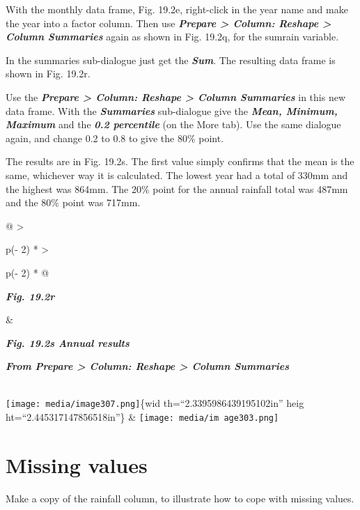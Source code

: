 \documentclass[
  letterpaper,
  DIV=11,
  numbers=noendperiod]{scrreprt}
\begin{document}
With the monthly data frame, Fig. 19.2e, right-click in the year name
and make the year into a factor column. Then use \textbf{\emph{Prepare
\textgreater{} Column: Reshape \textgreater{} Column Summaries}} again
as shown in Fig. 19.2q, for the sumrain variable.

In the summaries sub-dialogue just get the \textbf{\emph{Sum}}. The
resulting data frame is shown in Fig. 19.2r.

Use the \textbf{\emph{Prepare \textgreater{} Column: Reshape
\textgreater{} Column Summaries}} in this new data frame. With the
\textbf{\emph{Summaries}} sub-dialogue give the \textbf{\emph{Mean,
Minimum,}} \textbf{\emph{Maximum}} and the \textbf{\emph{0.2
percentile}} (on the More tab). Use the same dialogue again, and change
0.2 to 0.8 to give the 80\% point.

The results are in Fig. 19.2s. The first value simply confirms that the
mean is the same, whichever way it is calculated. The lowest year had a
total of 330mm and the highest was 864mm. The 20\% point for the annual
rainfall total was 487mm and the 80\% point was 717mm.

\begin{longtable}[]{@{}
  >{\raggedright\arraybackslash}p{(\columnwidth - 2\tabcolsep) * }
  >{\raggedright\arraybackslash}p{(\columnwidth - 2\tabcolsep) * }@{}}
\toprule\noalign{}
\begin{minipage}[b]{\linewidth}\raggedright
\textbf{\emph{Fig. 19.2r}}
\end{minipage} & \begin{minipage}[b]{\linewidth}\raggedright
\textbf{\emph{Fig. 19.2s Annual results}}

\textbf{\emph{From Prepare \textgreater{} Column: Reshape \textgreater{}
Column Summaries}}
\end{minipage} \\
\midrule\noalign{}
\endhead
\bottomrule\noalign{}
\endlastfoot
\texttt{[image: media/image307.png]}\{wid th=``2.3395986439195102in''
heig ht=``2.445317147856518in''\} &
\texttt{[image: media/im age303.png]} \\
\end{longtable}

\section{Missing values}\label{missing-values}

Make a copy of the rainfall column, to illustrate how to cope with
missing values.
\end{document}

